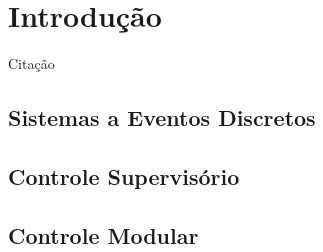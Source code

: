 \section{Introdução}
Citação \cite{Ramadge1989}
\subsection{Sistemas a Eventos Discretos}
\subsection{Controle Supervisório}
\subsection{Controle Modular}
